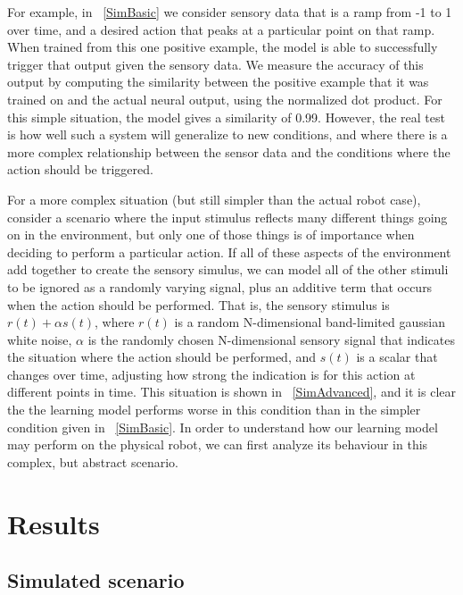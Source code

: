 \documentclass{frontiersSCNS}
\begin{document}
For example, in \figurename~\ref{SimBasic} we consider sensory data that is
a ramp from -1 to 1 over time, and a desired action that peaks at a particular
point on that ramp.  When trained from this one positive example, the model
is able to successfully trigger that output given the sensory data.  We measure
the accuracy of this output by computing the similarity between
the positive example that it was trained on and the actual neural output,
using the normalized dot product.  For this simple situation, the model gives
a similarity of 0.99.  However, the real test is how well such a system will
generalize to new conditions, and where there is a more complex relationship
between the sensor data and the conditions where the action should be triggered.

For a more complex situation (but still simpler than the actual robot case),
consider a scenario where the input stimulus reflects many different things
going on in the environment, but only one of those things is of importance
when deciding to perform a particular action.  If all of these aspects of
the environment add together to create the sensory simulus, we can model all 
of the other stimuli to be ignored as a randomly varying signal, plus an
additive term that occurs when the action should be performed.  That is, the
sensory stimulus is $r(t) + \alpha s(t)$, where $r(t)$ is a random N-dimensional
band-limited gaussian white noise, $\alpha$ is the randomly chosen N-dimensional
sensory signal that indicates the situation where the action should be performed,
and $s(t)$ is a scalar that changes over time, adjusting how strong the
indication is for this action at different points in time.  This situation 
is shown in \figurename~\ref{SimAdvanced}, and it is clear the the learning model
performs worse in this condition than in the simpler condition given in 
\figurename~\ref{SimBasic}.  In order to understand how our learning
model may perform on the physical robot, we can first analyze its behaviour 
in this complex, but abstract scenario.

\section{Results}

\subsection{Simulated scenario}
\end{document}
